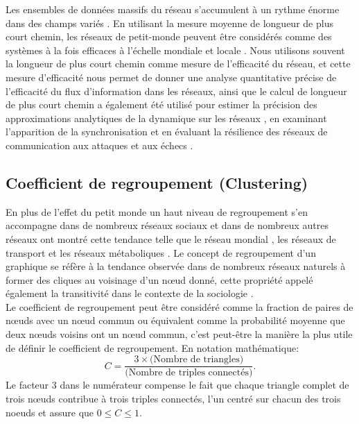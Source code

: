    Les ensembles de données massifs du réseau s'accumulent à un rythme énorme dans des champs variés \cite{Qi-al2010}. En utilisant la mesure moyenne de longueur de plus court chemin, les réseaux de petit-monde peuvent être considérés comme des systèmes à la fois efficaces à l'échelle mondiale et locale \cite{Latora-Marchiori2001}. Nous utilisons souvent la longueur de plus court chemin comme mesure de l'efficacité du réseau, et cette mesure d'efficacité nous permet de donner une analyse quantitative précise de l'efficacité du flux d'information dans les réseaux, ainsi que le calcul de longueur de plus court chemin a également été utilisé pour estimer la précision des approximations analytiques de la dynamique sur les réseaux \cite{Melnik-al2011}, en examinant l'apparition de la synchronisation \cite{Zhao-al2006} et en évaluant la résilience des réseaux de communication aux attaques et aux échecs \cite{Albert-al2000}.
   
   \subsection{Coefficient de regroupement (Clustering)}
   En plus de l'effet du petit monde un haut niveau de regroupement s'en accompagne dans de nombreux
   réseaux sociaux et dans de nombreux autres réseaux ont montré cette tendance telle
   que le réseau mondial \cite{Lad1999}, les réseaux de transport \cite{Seb-al2022} et les réseaux métaboliques \cite{WD2000,SC2001}.
   Le concept de regroupement d'un graphique
   se réfère à la tendance observée dans de nombreux réseaux naturels à former des cliques au voisinage d'un nœud donné, 
   cette propriété appelé également la transitivité dans le contexte de la sociologie \cite{Wa1994}.\\
   Le coefficient de regroupement peut être considéré comme la fraction de paires de nœuds avec un nœud commun
   ou équivalent comme la probabilité moyenne que deux nœuds voisins ont un nœud commun, c'est peut-\^{e}tre la manière
   la plus utile de définir le coefficient de regroupement. En notation mathématique:
    \begin{equation}
    C=\frac{3\times\text{(Nombre de triangles)}}{\text{(Nombre de triples connectés)}}
    \label{Clustering}.
   \end{equation}
   Le facteur $3$ dans le numérateur compense le fait que chaque triangle complet de trois nœuds contribue à trois triples
   connectés, l'un centré sur chacun des trois noeuds et assure que $0\leq C\leq 1$.
 

